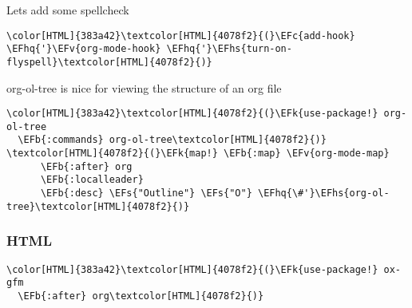 \documentclass{scrartcl}
\newcommand{\EFk}[1]{\textcolor{EFk}{#1}} %
\newcommand{\EFs}[1]{\textcolor{EFs}{#1}} %
\newcommand{\EFb}[1]{\textcolor{EFb}{#1}} %
\newcommand{\EFc}[1]{\textcolor{EFc}{#1}} %
\newcommand{\EFv}[1]{\textcolor{EFv}{#1}} %
\newcommand{\EFhq}[1]{\textcolor{EFhq}{#1}} %
\newcommand{\EFhs}[1]{\textcolor{EFhs}{#1}} %
\begin{document}
Lets add some spellcheck
\begin{Code}
\begin{Verbatim}[]
\color[HTML]{383a42}\textcolor[HTML]{4078f2}{(}\EFc{add-hook} \EFhq{'}\EFv{org-mode-hook} \EFhq{'}\EFhs{turn-on-flyspell}\textcolor[HTML]{4078f2}{)}
\end{Verbatim}
\end{Code}

org-ol-tree is nice for viewing the structure of an org file
\begin{Code}
\begin{Verbatim}[]
\color[HTML]{383a42}\textcolor[HTML]{4078f2}{(}\EFk{use-package!} org-ol-tree
  \EFb{:commands} org-ol-tree\textcolor[HTML]{4078f2}{)}
\textcolor[HTML]{4078f2}{(}\EFk{map!} \EFb{:map} \EFv{org-mode-map}
      \EFb{:after} org
      \EFb{:localleader}
      \EFb{:desc} \EFs{"Outline"} \EFs{"O"} \EFhq{\#'}\EFhs{org-ol-tree}\textcolor[HTML]{4078f2}{)}
\end{Verbatim}
\end{Code}

\subsubsection{HTML}
\label{sec:orgffb3d3d}
\begin{Code}
\begin{Verbatim}[]
\color[HTML]{383a42}\textcolor[HTML]{4078f2}{(}\EFk{use-package!} ox-gfm
  \EFb{:after} org\textcolor[HTML]{4078f2}{)}
\end{Verbatim}
\end{Code}
\end{document}
